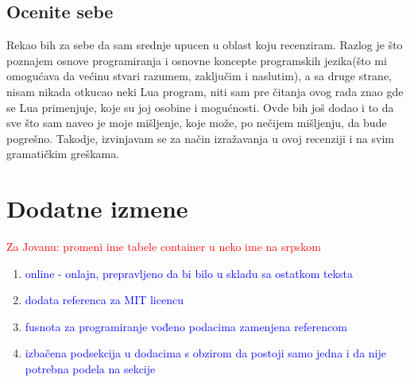 \documentclass[a4paper]{report}
\newcommand{\odgovorAutora}[1]{\textcolor{blue}{#1}}
\newcommand{\note}[1]{\textcolor{red}{#1}}
\begin{document}
\section{Ocenite sebe}

Rekao bih za sebe da sam srednje upucen u oblast koju recenziram. Razlog je \v sto poznajem osnove programiranja i
osnovne koncepte programskih jezika(\v sto mi omogu\' cava da ve\' cinu stvari razumem, zaklju\v cim i naslutim), a sa druge strane,
nisam nikada otkucao neki Lua program, niti sam pre \v citanja ovog rada znao gde se Lua primenjuje, koje su joj osobine i mogu\' cnosti. Ovde bih jo\v s dodao i to
da sve \v sto sam naveo je moje mi\v sljenje, koje mo\v ze, po ne\v cijem mi\v sljenju, da bude pogre\v sno. Takodje, izvinjavam se za na\v cin izra\v zavanja u ovoj recenziji i na svim gramati\v ckim gre\v skama.


\chapter{Dodatne izmene}
\note{Za Jovanu: promeni ime tabele container u neko ime na srpskom}
\begin{enumerate}
\item \odgovorAutora{online - onlajn, prepravljeno da bi bilo u skladu sa ostatkom teksta}
\item \odgovorAutora{dodata referenca za MIT licencu}
\item \odgovorAutora{fusnota za programiranje vođeno podacima zamenjena referencom}
\item \odgovorAutora{izbačena podsekcija u dodacima s obzirom da postoji samo jedna i da nije potrebna podela na sekcije}
\end{enumerate} 
\end{document}
